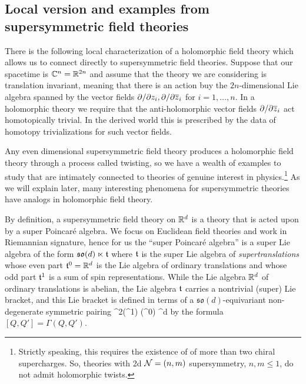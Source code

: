 \documentclass[11pt]{amsart}
\def\del{\partial}
\begin{document}
\subsection{Local version and examples from supersymmetric field theories}


There is the following local characterization of a holomorphic field theory which allows us to connect directly to supersymmetric field theories. 
Suppose that our spacetime is $\mathbb C^n = \mathbb R^{2n}$ and assume that the theory we are considering is translation invariant, meaning that there is an action buy the $2n$-dimensional Lie algebra spanned by the vector fields $\del / \del {z_i}, \del / \del {\zbar_i}$ for $i=1,\ldots,n$. 
In a holomorphic theory we require that the anti-holomorphic vector fields $\del / \del {\zbar_i}$ act homotopically trivial. 
In the derived world this is prescribed by the data of homotopy trivializations for such vector fields. 

Any even dimensional supersymmetric field theory produces a holomorphic field theory through a process called twisting,
so we have a wealth of examples to study that are intimately connected to theories of genuine interest in physics.\footnote{Strictly speaking, this requires the existence of of more than two chiral supercharges. So, theories with 2d $\mathcal N = (n,m)$ supersymmetry, $n,m \leq 1$, do not admit holomorphic twists.}
As we will explain later, many interesting phenomena for supersymmetric theories have analogs in holomorphic field theory.
 
By definition, a supersymmetric field theory on $\mathbb R^d$ is a theory that is acted upon by a super Poincar\'{e} algebra. 
We focus on Euclidean field theories and work in Riemannian signature,
hence for us the ``super Poincar\'{e} algebra'' is a super Lie algebra of the form
$\mathfrak{so}(d) \ltimes \mathfrak t$
where $\mathfrak t$ is the super Lie algebra of {\em supertranslations} whose even part $\mathfrak t^0 = \mathbb R^d$ is the Lie algebra of ordinary translations and whose odd part $\mathfrak t^1$ is a sum of spin representations. 
While the Lie algebra $\mathbb R^d$ of ordinary translations is abelian, the Lie algebra $\mathfrak t$ carries a nontrivial (super) Lie bracket,
and this Lie bracket is defined in terms of a $\mathfrak{so}(d)$-equivariant non-degenerate symmetric pairing
\beqn
\label{e:Gamma}
\Gamma {}^2(\ft^{1}) (\ft^0) \cong \RR^d 
\eeqn
by the formula $[Q, Q'] = \Gamma(Q, Q')$. 
\end{document}
